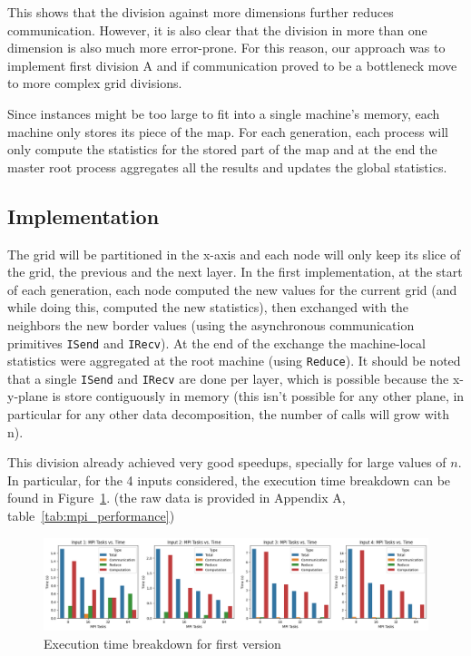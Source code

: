 \documentclass{article}
\begin{document}
This shows that the division against more dimensions further reduces communication.
However, it is also clear that the division in more than one dimension is also
much more error-prone. For this reason, our approach was to implement first division
A and if communication proved to be a bottleneck move to more complex grid divisions.

Since instances might be too large to fit into a single machine's memory, each
machine only stores its piece of the map. For each generation, each process will
only compute the statistics for the stored part of the map and at the end the master
root process aggregates all the results and updates the global statistics.

\subsection{Implementation}

The grid will be partitioned in the x-axis and each node will only keep its slice of the grid, the previous and
the next layer.
In the first implementation, at the start of each generation, each node computed
the new values for the current grid (and while doing this, computed the new
statistics), then exchanged with the neighbors the new border values (using the asynchronous
communication primitives \texttt{ISend} and \texttt{IRecv}). At the end of the
exchange the machine-local statistics were aggregated at the root machine (using \texttt{Reduce}).
It should be noted that a single \texttt{ISend} and \texttt{IRecv} are done per layer,
which is possible because the x-y-plane is store contiguously in memory (this isn't possible
for any other plane, in particular for any other data decomposition, the number of calls will
grow with n).

This division already achieved very good speedups, specially for large values of 
$n$. In particular, for the 4 inputs considered, the execution time breakdown can
be found in Figure~\ref{time-breakdown}.
(the raw data is provided in Appendix A, table~\ref{tab:mpi_performance})

\begin{figure}[htbp]
    \centering
    \includegraphics[width=1\textwidth]{img/first-version-breakdown.png}
    \caption{Execution time breakdown for first version}
    \label{time-breakdown}
\end{figure}
\end{document}
